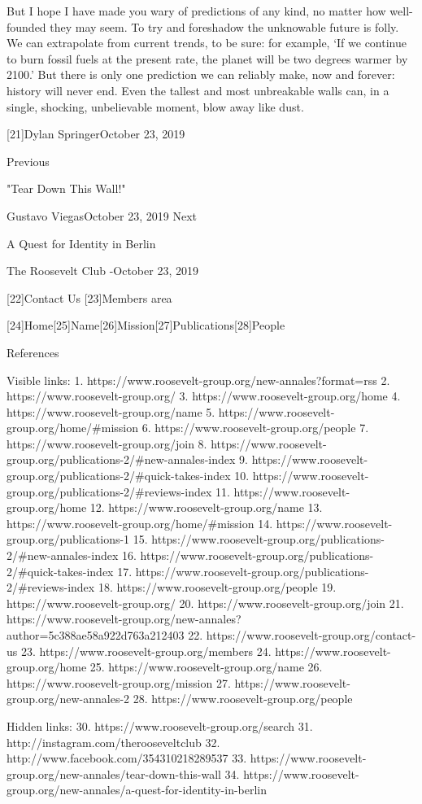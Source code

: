    But I hope I have made you wary of predictions of any kind, no matter
   how well-founded they may seem. To try and foreshadow the unknowable
   future is folly. We can extrapolate from current trends, to be sure:
   for example, `If we continue to burn fossil fuels at the present rate,
   the planet will be two degrees warmer by 2100.' But there is only one
   prediction we can reliably make, now and forever: history will never
   end. Even the tallest and most unbreakable walls can, in a single,
   shocking, unbelievable moment, blow away like dust.

   [21]Dylan SpringerOctober 23, 2019

   Previous

"Tear Down This Wall!"

   Gustavo ViegasOctober 23, 2019
   Next

A Quest for Identity in Berlin

   The Roosevelt Club -October 23, 2019

   [22]Contact Us
   [23]Members area

   [24]Home[25]Name[26]Mission[27]Publications[28]People

References

   Visible links:
   1. https://www.roosevelt-group.org/new-annales?format=rss
   2. https://www.roosevelt-group.org/
   3. https://www.roosevelt-group.org/home
   4. https://www.roosevelt-group.org/name
   5. https://www.roosevelt-group.org/home/#mission
   6. https://www.roosevelt-group.org/people
   7. https://www.roosevelt-group.org/join
   8. https://www.roosevelt-group.org/publications-2/#new-annales-index
   9. https://www.roosevelt-group.org/publications-2/#quick-takes-index
  10. https://www.roosevelt-group.org/publications-2/#reviews-index
  11. https://www.roosevelt-group.org/home
  12. https://www.roosevelt-group.org/name
  13. https://www.roosevelt-group.org/home/#mission
  14. https://www.roosevelt-group.org/publications-1
  15. https://www.roosevelt-group.org/publications-2/#new-annales-index
  16. https://www.roosevelt-group.org/publications-2/#quick-takes-index
  17. https://www.roosevelt-group.org/publications-2/#reviews-index
  18. https://www.roosevelt-group.org/people
  19. https://www.roosevelt-group.org/
  20. https://www.roosevelt-group.org/join
  21. https://www.roosevelt-group.org/new-annales?author=5c388ae58a922d763a212403
  22. https://www.roosevelt-group.org/contact-us
  23. https://www.roosevelt-group.org/members
  24. https://www.roosevelt-group.org/home
  25. https://www.roosevelt-group.org/name
  26. https://www.roosevelt-group.org/mission
  27. https://www.roosevelt-group.org/new-annales-2
  28. https://www.roosevelt-group.org/people

   Hidden links:
  30. https://www.roosevelt-group.org/search
  31. http://instagram.com/therooseveltclub
  32. http://www.facebook.com/354310218289537
  33. https://www.roosevelt-group.org/new-annales/tear-down-this-wall
  34. https://www.roosevelt-group.org/new-annales/a-quest-for-identity-in-berlin
